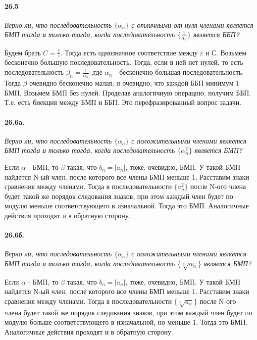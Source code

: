 \documentclass{book}
\begin{document}
\paragraph{26.5}
\textit{Верно ли, что последовательность $\{\alpha_n\}$ с отличными от нуля членами является БМП тогда и только тогда, когда последовательность $\{\frac{1}{\alpha_n}\}$ является ББП?}

Будем брать $C = \frac{1}{\varepsilon}$. Тогда есть однозначное соответствие между $\varepsilon$ и С. Возьмем бесконечно большую последовательность. Тогда, если в ней нет нулей, то есть последовательность $\beta_n = \frac{1}{\alpha_n}$ ,где $\alpha_n$ - бесконечно большая последовательность. Тогда $\beta$ очевидно бесконечно малая, и очевидно, что каждой ББП минимум 1 БМП. Возьмем БМП без нулей. Проделав аналогичную операцию, получим ББП. Т.е. есть биекция между БМП и ББП. Это перефразированный вопрос задачи.

\paragraph{26.6a.}
\textit{Верно ли, что последовательность $\{\alpha_n\}$ с  положительными членами является БМП тогда и только тогда, когда последовательность $\{\alpha_n^2\}$ является БМП?}

Если $\alpha$ - БМП, то $\beta$ такая, что $b_n = |a_n|$, тоже, очевидно, БМП. У такой БМП найдется N-ый член, после которого все члены БМП меньше 1. Расставим знаки сравнения между членами. Тогда в последовательности $\{a_n^2\}$ после N-ого члена будет такой же порядок следования знаков, при этом каждый член будет по модулю меньше соответствующего в изначальной. Тогда это БМП. Аналогичные действия проходят и в обратную сторону. 

\paragraph{26.6б.}
\textit{Верно ли, что последовательность $\{\alpha_n\}$ с  положительными членами является БМП тогда и только тогда, когда последовательность $\{\sqrt[3]{\alpha_n}\}$ является БМП?}

Если $\alpha$ - БМП, то $\beta$ такая, что $b_n = |a_n|$, тоже, очевидно, БМП. У такой БМП найдется N-ый член, после которого все члены БМП меньше 1. Расставим знаки сравнения между членами. Тогда в последовательности $\{\sqrt[3]{a_n}\}$ после N-ого члена будет такой же порядок следования знаков, при этом каждый член будет по модулю больше соответствующего в изначальной, но меньше 1. Тогда это БМП. Аналогичные действия проходят и в обратную сторону. 
\end{document}
